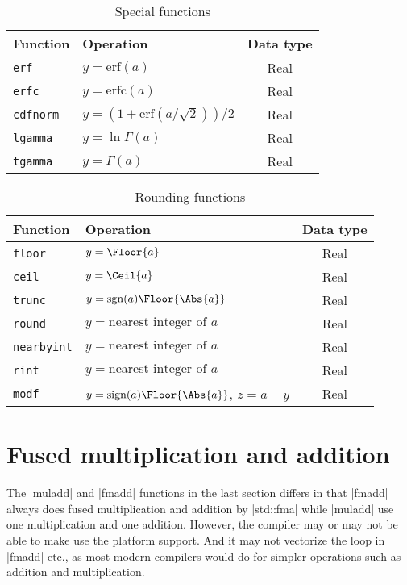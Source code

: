 \begin{table}
  \begin{tabularx}{\textwidth}{LLC}
    \toprule
    Function & Operation & Data type \\
    \midrule
    \texttt{erf}     & $y = \mathrm{erf}(a)$  & Real \\
    \texttt{erfc}    & $y = \mathrm{erfc}(a)$ & Real \\
    \texttt{cdfnorm} & $y = (1 + \mathrm{erf}(a / \sqrt{2})) / 2$ & Real \\
    \texttt{lgamma}  & $y = \ln\Gamma(a)$     & Real \\
    \texttt{tgamma}  & $y = \Gamma(a)$        & Real \\
    \bottomrule
  \end{tabularx}
  \caption{Special functions}
  \label{tab:Special functions}
\end{table}

\begin{table}
  \begin{tabularx}{\textwidth}{LLC}
    \toprule
    Function & Operation & Data type \\
    \midrule
    \texttt{floor} & $y = \Floor{a}$                       & Real \\
    \texttt{ceil}  & $y = \Ceil{a}$                        & Real \\
    \texttt{trunc} & $y = \mathrm{sgn}(a)\Floor{\Abs{a}}$  & Real \\
    \texttt{round} & $y = \text{nearest integer of }a$     & Real \\
    \texttt{nearbyint} & $y = \text{nearest integer of }a$ & Real \\
    \texttt{rint}  & $y = \text{nearest integer of }a$     & Real \\
    \texttt{modf}&$y = \mathrm{sign}(a)\Floor{\Abs{a}}$, $z = a - y$ & Real \\
    \bottomrule
  \end{tabularx}
  \caption{Rounding functions}
  \label{tab:Rounding functions}
\end{table}

\clearpage

\section{Fused multiplication and addition}
\label{sec:Fused multiplication and addition}

The |muladd| and |fmadd| functions in the last section differs in that |fmadd|
always does fused multiplication and addition by |std::fma| while |muladd| use
one multiplication and one addition. However, the compiler may or may not be
able to make use the platform \fma support. And it may not vectorize the loop
in |fmadd| etc., as most modern \cpp compilers would do for simpler operations
such as addition and multiplication.

